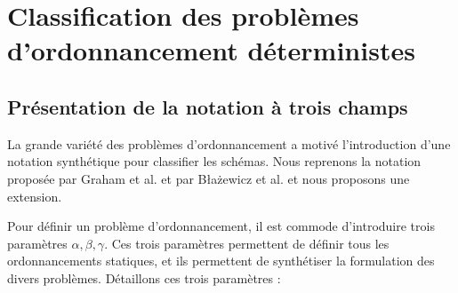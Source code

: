 \documentclass[a4paper,11pt]{article}
\begin{document}
\section{Classification des problèmes d'ordonnancement  déterministes}



\subsection{Présentation de la notation à trois champs}

La grande variété des problèmes d'ordonnancement a motivé l'introduction d'une notation synthétique
pour classifier les schémas. Nous reprenons la notation proposée par Graham et al. \cite{graham} et
par B\l a\. zewicz et al. \cite{blazewicz} et nous proposons une extension.

Pour définir un problème d'ordonnancement, il est commode d'introduire trois paramètres
$\alpha,\beta,\gamma$. Ces trois paramètres permettent de définir tous les ordonnancements
statiques, et ils permettent de synthétiser la formulation des divers problèmes. Détaillons ces
trois paramètres :
\end{document}
